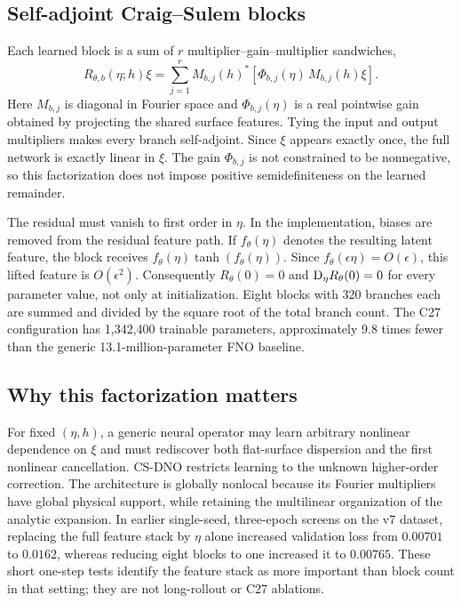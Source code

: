 \subsection{Self-adjoint Craig--Sulem blocks}

Each learned block is a sum of $r$ multiplier--gain--multiplier sandwiches,
\begin{equation}
  R_{\theta,b}(\eta;h)\xi
  =\sum_{j=1}^{r}M_{b,j}(h)^*
    \left[\Phi_{b,j}(\eta)\,M_{b,j}(h)\xi\right].
  \label{eq:cs-block}
\end{equation}
Here $M_{b,j}$ is diagonal in Fourier space and
$\Phi_{b,j}(\eta)$ is a real pointwise gain obtained by projecting the shared
surface features. Tying the input and output multipliers makes every branch
self-adjoint. Since $\xi$ appears exactly once, the full network is exactly
linear in $\xi$.  The gain $\Phi_{b,j}$ is not constrained to be nonnegative,
so this factorization does not impose positive semidefiniteness on the learned
remainder.

The residual must vanish to first order in $\eta$. In the implementation,
biases are removed from the residual feature path.  If $f_\theta(\eta)$
denotes the resulting latent feature, the block receives
$f_\theta(\eta)\tanh(f_\theta(\eta))$.  Since
$f_\theta(\epsilon\eta)=O(\epsilon)$, this lifted feature is
$O(\epsilon^2)$. Consequently $R_\theta(0)=0$ and
$\mathrm{D}_\eta R_\theta(0)=0$ for every parameter value, not only at
initialization. Eight blocks with 320 branches each are summed and divided by
the square root of the total branch count. The C27 configuration has
1,342,400 trainable parameters, approximately 9.8 times fewer than the
generic 13.1-million-parameter FNO baseline.

\subsection{Why this factorization matters}

For fixed $(\eta,h)$, a generic neural operator may learn arbitrary nonlinear
dependence on $\xi$ and must rediscover both flat-surface dispersion and the
first nonlinear cancellation. CS-DNO restricts learning to the unknown
higher-order correction. The architecture is globally nonlocal because its
Fourier multipliers have global physical support, while retaining the
multilinear organization of the analytic expansion. In earlier single-seed,
three-epoch screens on the v7 dataset, replacing the full feature stack by
$\eta$ alone increased validation loss from $0.00701$ to $0.0162$, whereas
reducing eight blocks to one increased it to $0.00765$.  These short
one-step tests identify the feature stack as more important than block count
in that setting; they are not long-rollout or C27 ablations.
